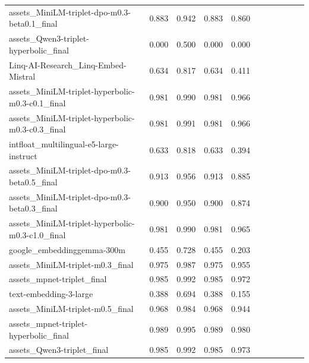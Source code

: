 \begin{tabular}{lcccccccccc}
assets_MiniLM-triplet-dpo-m0.3-beta0.1_final & 0.883 & 0.942 & 0.883 & 0.860 \\
assets_Qwen3-triplet-hyperbolic_final & 0.000 & 0.500 & 0.000 & 0.000 \\
Linq-AI-Research_Linq-Embed-Mistral & 0.634 & 0.817 & 0.634 & 0.411 \\
assets_MiniLM-triplet-hyperbolic-m0.3-c0.1_final & 0.981 & 0.990 & 0.981 & 0.966 \\
assets_MiniLM-triplet-hyperbolic-m0.3-c0.3_final & 0.981 & 0.991 & 0.981 & 0.966 \\
intfloat_multilingual-e5-large-instruct & 0.633 & 0.818 & 0.633 & 0.394 \\
assets_MiniLM-triplet-dpo-m0.3-beta0.5_final & 0.913 & 0.956 & 0.913 & 0.885 \\
assets_MiniLM-triplet-dpo-m0.3-beta0.3_final & 0.900 & 0.950 & 0.900 & 0.874 \\
assets_MiniLM-triplet-hyperbolic-m0.3-c1.0_final & 0.981 & 0.990 & 0.981 & 0.965 \\
google_embeddinggemma-300m & 0.455 & 0.728 & 0.455 & 0.203 \\
assets_MiniLM-triplet-m0.3_final & 0.975 & 0.987 & 0.975 & 0.955 \\
assets_mpnet-triplet_final & 0.985 & 0.992 & 0.985 & 0.972 \\
text-embedding-3-large & 0.388 & 0.694 & 0.388 & 0.155 \\
assets_MiniLM-triplet-m0.5_final & 0.968 & 0.984 & 0.968 & 0.944 \\
assets_mpnet-triplet-hyperbolic_final & 0.989 & 0.995 & 0.989 & 0.980 \\
assets_Qwen3-triplet_final & 0.985 & 0.992 & 0.985 & 0.973 \\
\bottomrule
\end{tabular}

